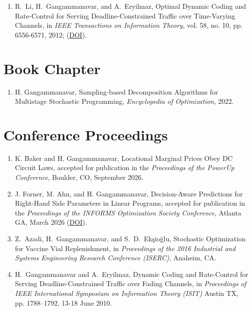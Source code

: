 \documentclass[hyperref, margin]{myResume}
\begin{document}
\begin{resume}
\begin{enumerate}[label=J\arabic*., leftmargin=*]
	\item R.\ Li, H.\ Gangammanavar, and A.\ Eryilmaz, Optimal Dynamic Coding and Rate-Control for Serving Deadline-Constrained Traffic over Time-Varying Channels, in \textit{IEEE Transactions on Information Theory}, vol. 58, no. 10, pp. 6556-6571, 2012; (\href{https://doi.org/10.1109/TIT.2012.2204031}{DOI}).
\end{enumerate}

\section{Book Chapter}
\begin{enumerate}[label=B\arabic*., leftmargin=*]
	\item H. Gangammanavar, Sampling-based Decomposition Algorithms for Multistage Stochastic Programming, \textit{Encyclopedia of Optimization}, 2022.
\end{enumerate}

\section{Conference Proceedings}
\begin{enumerate}[label=C\arabic*., leftmargin=*]
	\item K. Baker and H. Gangammanavar, Locational Marginal Prices Obey DC Circuit Laws,  accepted for publication in the \textit{Proceedings of the PowerUp Conference}, Boulder, CO, September 2026.
	\item J. Forner\footnotemark[1], M. Ahn, and H. Gangammanavar, Decision-Aware Predictions for Right-Hand Side Parameters in Linear Programs, accepted for publication in the \textit{Proceedings of the INFORMS Optimization Society Conference}, Atlanta GA, March 2026 (\href{https://doi.org/10.5281/zenodo.19688348}{DOI}).
	\item  Z.\ Azadi\footnotemark[3], H.\ Gangammanavar, and S.\ D.\ Ek{\c{s}}io{\u{g}}lu, Stochastic Optimization for Vaccine Vial Replenishment, in \textit{Proceedings of the 2016 Industrial and Systems Engineering Research Conference (ISERC)}, Anaheim, CA.
	\item H.\ Gangammanavar and A.\ Eryilmaz, Dynamic Coding and Rate-Control for Serving Deadline-Constrained Traffic over Fading Channels, in \textit{Proceedings of IEEE International Symposium on Information Theory (ISIT)} Austin TX, pp. 1788--1792, 13-18 June 2010.
\end{enumerate}


\end{resume}
\end{document}
